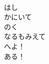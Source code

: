 \documentclass[10pt,b5j]{tarticle} %
\begin{document}
\begin{enumerate}
\begin{minipage}[c]{\blocksize}
        \vspace{\linespace}
        \item~\\
        はし\\
        かにいて\\
        のく\\
        なるもみえて\\
        へよ！\\
        ある！
    
    \end{minipage}
\end{enumerate} %
\end{document}
